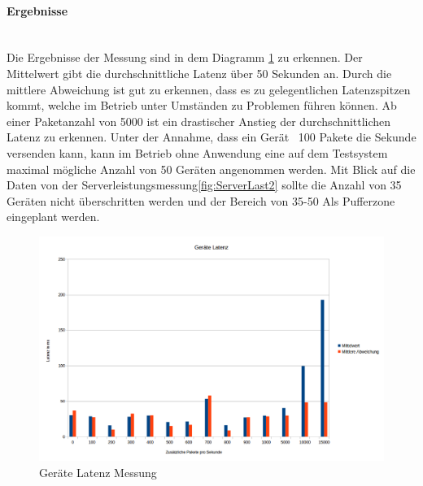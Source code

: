 \documentclass[a4paper]{spie}  %
\begin{document}
\begin{minipage}[t]{0.4\textwidth}
\vspace{0pt}

\paragraph{Ergebnisse}\mbox{}\\
Die Ergebnisse der Messung sind in dem Diagramm \ref{fig:LatenzMessung} zu erkennen. Der Mittelwert gibt die durchschnittliche Latenz über 50 Sekunden an. Durch die mittlere Abweichung ist gut zu erkennen, dass es zu gelegentlichen Latenzspitzen kommt, welche im Betrieb unter Umständen zu Problemen führen können. Ab einer Paketanzahl von 5000 ist ein drastischer Anstieg der durchschnittlichen Latenz zu erkennen. Unter der Annahme, dass ein Gerät ~100 Pakete die Sekunde versenden kann, kann im Betrieb ohne Anwendung eine auf dem Testsystem maximal mögliche Anzahl von 50 Geräten angenommen werden. Mit Blick auf die Daten von der Serverleistungsmessung\ref{fig:ServerLast2} sollte die Anzahl von 35 Geräten nicht überschritten werden und der Bereich von 35-50 Als Pufferzone eingeplant werden.

\end{minipage}
\hfill
\begin{minipage}[t]{0.5\textwidth}
	\begin{figure}[H]
	\vspace{0pt}
		\centering
		\centering
		\includegraphics[width=1\textwidth]{./images/LatenzMessung.png}
		\caption{Geräte Latenz Messung}
		\label{fig:LatenzMessung}
	\end{figure}	
\end{minipage}
\end{document}

